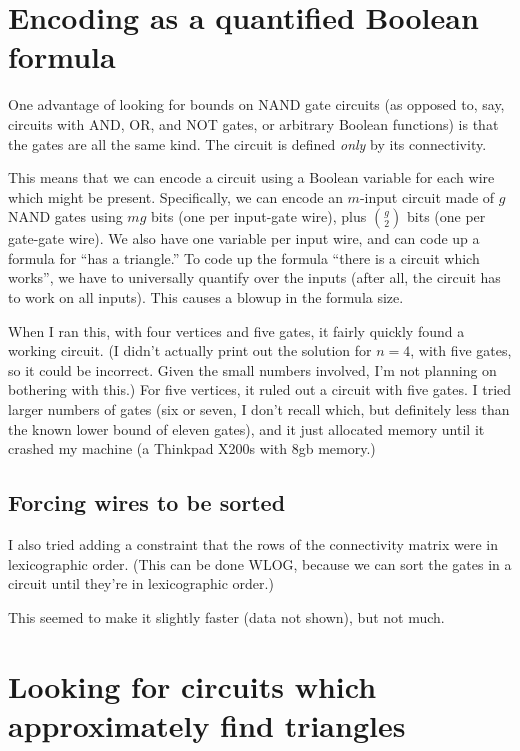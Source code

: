 \documentclass[12pt]{article}
\begin{document}
\section{Encoding as a quantified Boolean formula}

One advantage of looking for bounds on NAND gate circuits
(as opposed to, say, circuits with AND, OR, and NOT gates,
or arbitrary Boolean functions) is that the gates are all
the same kind. The circuit is defined {\em only} by its
connectivity.

This means that we can encode a circuit
using a Boolean variable for each wire which might be
present. Specifically, we can encode an $m$-input circuit
made of $g$ NAND gates using $mg$ bits (one per input-gate
wire), plus $g \choose 2$ bits (one per gate-gate wire).
We also have one variable per input wire, and can code up
a formula for ``has a triangle.''
To code up the formula ``there is a circuit which works'', we
have to universally quantify over the inputs (after all, the
circuit has to work on all inputs). This causes a
blowup in the formula size.

When I ran this, with four vertices and five gates, it
fairly quickly found a working circuit. 
(I didn't actually print out the solution for $n=4$, with
five gates, so it could be incorrect. Given the small numbers
involved, I'm not planning on bothering with this.)
For five vertices, it ruled out a circuit with five gates.
I tried larger numbers of gates (six or seven, I don't recall
which, but definitely less than the known lower bound of eleven
gates), and it just allocated memory until it crashed
my machine (a Thinkpad X200s with 8gb memory.)

\subsection{Forcing wires to be sorted}

I also tried adding a constraint that the rows of
the connectivity matrix were in lexicographic order.
(This can be done WLOG, because we can sort the
gates in a circuit until they're in lexicographic
order.)


This seemed
to make it slightly faster (data not shown), but not
much.

\section{Looking for circuits which approximately find triangles}
\end{document}

